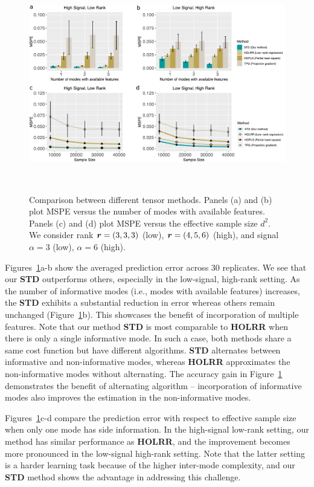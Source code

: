 \documentclass[12pt]{article}
\theoremstyle{definition}
\theoremstyle{definition}
\begin{document}
\begin{figure}[ht]
\centering
\includegraphics[width=16cm]{compare_alternative.pdf} 
\caption{Comparison between different tensor methods. Panels (a) and (b) plot MSPE versus the number of modes with available features. Panels (c) and (d) plot MSPE versus the effective sample size $d^2$. We consider rank $\bm{r}=(3,3,3)$ (low), $\bm{r}=(4,5,6)$ (high), and signal $\alpha =3 $ (low), $\alpha=6$ (high).}~\label{fig:compare}
\end{figure}

Figures~\ref{fig:compare}a-b show the averaged prediction error across 30 replicates. We see that our {\bf STD} outperforms others, especially in the low-signal, high-rank setting. As the number of informative modes (i.e., modes with available features) increases, the {\bf STD} exhibits a substantial reduction in error whereas others remain unchanged (Figure~\ref{fig:compare}b). This showcases the benefit of incorporation of multiple features. Note that our method {\bf STD} is most comparable to {\bf HOLRR} when there is only a single informative mode. In such a case, both methods share a same cost function but have different algorithms. {\bf STD} alternates between informative and non-informative modes, whereas {\bf HOLRR} approximates the non-informative modes without alternating. The accuracy gain in Figure~\ref{fig:compare} demonstrates the benefit of alternating algorithm -- incorporation of informative modes also improves the estimation in the non-informative modes. 


Figures~\ref{fig:compare}c-d compare the prediction error with respect to effective sample size when only one mode has side information. In the high-signal low-rank setting, our method has similar performance as {\bf HOLRR}, and the improvement becomes more pronounced in the low-signal high-rank setting. Note that the latter setting is a harder learning task because of the higher inter-mode complexity, and our {\bf STD} method shows the advantage in addressing this challenge. 
\end{document}
